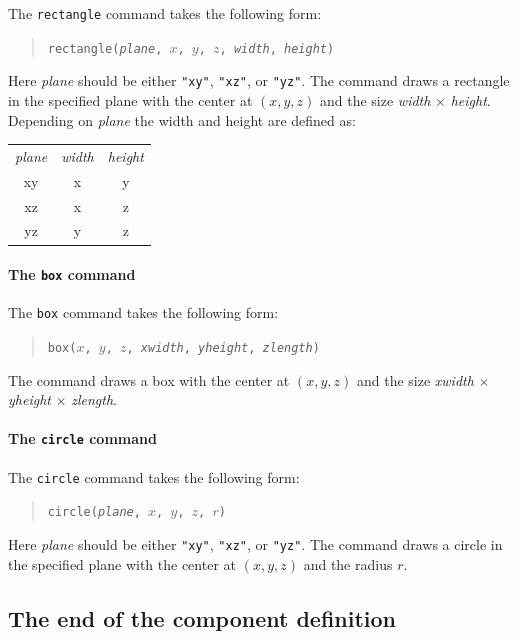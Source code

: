 The \texttt{rectangle} command takes the following form:
\begin{quote}
  \texttt{rectangle(\textit{plane}, $x$, $y$, $z$, \textit{width}, \textit{height})}
\end{quote}
Here \textit{plane} should be either \verb+"xy"+, \verb+"xz"+, or
\verb+"yz"+. The command draws a rectangle in the specified plane with
the center at $(x, y, z)$ and the size \textit{width} $\times$ \textit{
height}. Depending on \textit{plane} the width and height are defined as:\\
\begin{tabular} {ccc}
  \textit{plane} & \textit{width} & \textit{height} \\
  xy & x & y \\
  xz & x & z \\
  yz & y & z \\
 \end{tabular}

\paragraph{The \texttt{box} command}

The \texttt{box} command takes the following form:
\begin{quote}
  \texttt{box($x$, $y$, $z$, \textit{xwidth}, \textit{yheight}, \textit{zlength})}
\end{quote}
The command draws a box with the center at $(x, y, z)$ and the size \textit{xwidth} $\times$ \textit{yheight} $\times$ \textit{zlength}.

\paragraph{The \texttt{circle} command}

The \texttt{circle} command takes the following form:
\begin{quote}
  \texttt{circle(\textit{plane}, $x$, $y$, $z$, $r$)}
\end{quote}
Here \textit{plane} should be either \verb+"xy"+, \verb+"xz"+, or
\verb+"yz"+. The command draws a circle in the specified plane with the center
 at $(x, y, z)$ and the radius $r$.



\subsection{The end of the component definition}

